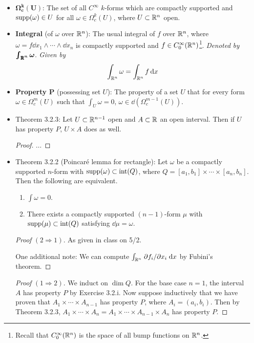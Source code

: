 \documentclass[../notes.tex]{subfiles}
\begin{document}
\begin{itemize}
    \item $\bm{\Omega_c^k(U)}$: The set of all $C^\infty$ $k$-forms which are compactly supported and $\operatorname{supp}(\omega)\in U$ for all $\omega\in\Omega_c^k(U)$, where $U\subset\mathbb{R}^n$ open.
    \item \textbf{Integral} (of $\omega$ over $\mathbb{R}^n$): The usual integral of $f$ over $\mathbb{R}^n$, where $\omega=f\dd{x_1}\wedge\cdots\wedge\dd{x_n}$ is compactly supported and $f\in C_0^\infty(\mathbb{R}^n)$\footnote{Recall that $C_0^\infty(\mathbb{R}^n)$ is the space of all bump functions on $\mathbb{R}^n$.}. \emph{Denoted by} $\bm{\int_{\pmb{\mathbb{R}}^n}\omega}$. \emph{Given by}
    \begin{equation*}
        \int_{\mathbb{R}^n}\omega = \int_{\mathbb{R}^n}f\dd{x}
    \end{equation*}
    \item \textbf{Property $\bm{P}$} (possessing set $U$): The property of a set $U$ that for every form $\omega\in\Omega_c^m(U)$ such that $\int_U\omega=0$, $\omega\in\dd(\Omega_c^{m-1}(U))$.
    \item Theorem 3.2.3: Let $U\subset\mathbb{R}^{n-1}$ open and $A\subset\mathbb{R}$ an open interval. Then if $U$ has property $P$, $U\times A$ does as well.
    \begin{proof}
        ...
    \end{proof}
    \item Theorem 3.2.2 (Poincar\'{e} lemma for rectangle): Let $\omega$ be a compactly supported $n$-form with $\operatorname{supp}(\omega)\subset\operatorname{int}(Q)$, where $Q=[a_1,b_1]\times\cdots\times[a_n,b_n]$. Then the following are equivalent.
    \begin{enumerate}
        \item $\int\omega=0$.
        \item There exists a compactly supported $(n-1)$-form $\mu$ with $\operatorname{supp}(\mu)\subset\operatorname{int}(Q)$ satisfying $\dd{\mu}=\omega$.
    \end{enumerate}
    \begin{proof}[Proof $(2\Rightarrow 1)$]
        As given in class on 5/2.\par
        One additional note: We can compute $\int_{\mathbb{R}^n}\pdv*{f_i}{x_i}\dd{x}$ by Fubini's theorem.
    \end{proof}
    \begin{proof}[Proof $(1\Rightarrow 2)$]
        We induct on $\dim Q$. For the base case $n=1$, the interval $A$ has property $P$ by Exercise 3.2.i. Now suppose inductively that we have proven that $A_1\times\cdots\times A_{n-1}$ has property $P$, where $A_i=(a_i,b_i)$. Then by Theorem 3.2.3, $A_1\times\cdots\times A_n=A_1\times\cdots\times A_{n-1}\times A_n$ has property $P$.

\end{proof}
\end{itemize}
\end{document}
